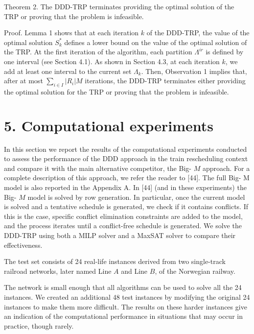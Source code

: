 \documentclass[10pt]{article}
\begin{document}
Theorem 2. The DDD-TRP terminates providing the optimal solution of the TRP or proving that the problem is infeasible.

Proof. Lemma 1 shows that at each iteration $k$ of the DDD-TRP, the value of the optimal solution $S_{k}^{*}$ defines a lower bound on the value of the optimal solution of the TRP. At the first iteration of the algorithm, each partition $\Lambda^{i r}$ is defined by one interval (see Section 4.1). As shown in Section 4.3, at each iteration $k$, we add at least one interval to the current set $\Lambda_{k}$. Then, Observation 1 implies that, after at most $\sum_{i \in I}\left|R_{i}\right| M$ iterations, the DDD-TRP terminates either providing the optimal solution for the TRP or proving that the problem is infeasible.

\section*{5. Computational experiments}
In this section we report the results of the computational experiments conducted to assess the performance of the DDD approach in the train rescheduling context and compare it with the main alternative competitor, the Big- $M$ approach. For a complete description of this approach, we refer the reader to [44]. The full Big- M model is also reported in the Appendix A. In [44] (and in these experiments) the Big- $M$ model is solved by row generation. In particular, once the current model is solved and a tentative schedule is generated, we check if it contains conflicts. If this is the case, specific conflict elimination constraints are added to the model, and the process iterates until a conflict-free schedule is generated. We solve the DDD-TRP using both a MILP solver and a MaxSAT solver to compare their effectiveness.

The test set consists of 24 real-life instances derived from two single-track railroad networks, later named Line $A$ and Line $B$, of the Norwegian railway.

The network is small enough that all algorithms can be used to solve all the 24 instances. We created an additional 48 test instances by modifying the original 24 instances to make them more difficult. The results on these harder instances give an indication of the computational performance in situations that may occur in practice, though rarely.
\end{document}
